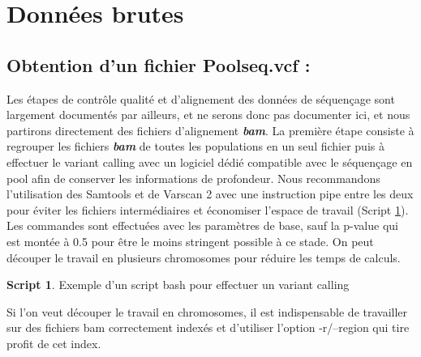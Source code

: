 \documentclass[
  openany]{book}
\theoremstyle{definition}
\theoremstyle{definition}
\newtheorem{example}{Script}[chapter]
\theoremstyle{definition}
\theoremstyle{definition}
\theoremstyle{remark}
\begin{document}
\hypertarget{donnuxe9es-brutes}{%
\chapter*{Données brutes}\label{donnuxe9es-brutes}}

\hypertarget{obtention-dun-fichier-poolseq.vcf}{%
\section*{Obtention d'un fichier Poolseq.vcf :}\label{obtention-dun-fichier-poolseq.vcf}}

Les étapes de contrôle qualité et d'alignement des données de séquençage sont largement documentés par ailleurs, et ne serons donc pas documenter ici, et nous partirons directement des fichiers d'alignement \textbf{\emph{bam}}. La première étape consiste à regrouper les fichiers \textbf{\emph{bam}} de toutes les populations en un seul fichier puis à effectuer le variant calling avec un logiciel dédié compatible avec le séquençage en pool afin de conserver les informations de profondeur. Nous recommandons l'utilisation des Samtools \citep{li_sequence_2009} et de Varscan 2 \citep{koboldt_varscan_2012} avec une instruction pipe entre les deux pour éviter les fichiers intermédiaires et économiser l'espace de travail (Script \ref{exm:script1}). Les commandes sont effectuées avec les paramètres de base, sauf la p-value qui est montée à 0.5 pour être le moins stringent possible à ce stade. On peut découper le travail en plusieurs chromosomes pour réduire les temps de calculs.

\begin{example}
\protect\hypertarget{exm:script1}{}\label{exm:script1}{Exemple d'un script bash pour effectuer un variant calling}
\end{example}

Si l'on veut découper le travail en chromosomes, il est indispensable de travailler sur des fichiers bam correctement indexés et d'utiliser l'option -r/--region qui tire profit de cet index.
\end{document}
